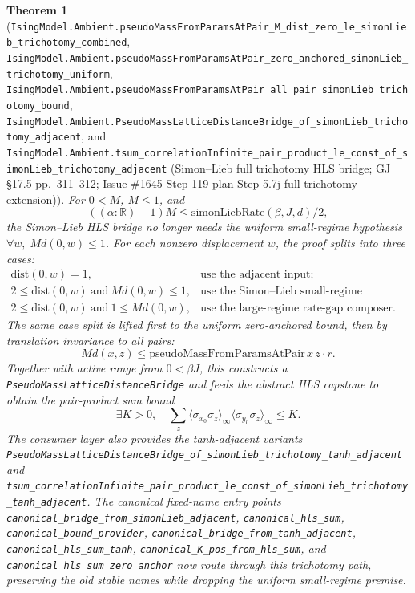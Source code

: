 \documentclass[a4paper,11pt]{article}
\newtheorem{theorem}{Theorem}
\begin{document}
\begin{theorem}[\texttt{IsingModel.Ambient.pseudoMassFromParamsAtPair\_M\_dist\_zero\_le\_simonLieb\_trichotomy\_combined},
\texttt{IsingModel.Ambient.pseudoMassFromParamsAtPair\_zero\_anchored\_simonLieb\_trichotomy\_uniform},
\texttt{IsingModel.Ambient.pseudoMassFromParamsAtPair\_all\_pair\_simonLieb\_trichotomy\_bound},
\texttt{IsingModel.Ambient.PseudoMassLatticeDistanceBridge\_of\_simonLieb\_trichotomy\_adjacent}, and
\texttt{IsingModel.Ambient.tsum\_correlationInfinite\_pair\_product\_le\_const\_of\_simonLieb\_trichotomy\_adjacent}
(Simon--Lieb full trichotomy HLS bridge; GJ \S17.5 pp.~311--312; Issue
\#1645 Step 119 plan Step 5.7j full-trichotomy extension)]
For $0 < M$, $M \le 1$, and
\[
  ((\alpha:\mathbb{R})+1)M \le \mathrm{simonLiebRate}(\beta,J,d)/2,
\]
the Simon--Lieb HLS bridge no longer needs the uniform small-regime hypothesis
$\forall w,\; M d(0,w) \le 1$.  For each nonzero displacement $w$, the proof
splits into three cases:
\[
\begin{array}{ll}
\mathrm{dist}(0,w)=1, & \text{use the adjacent input;}\\
2\le \mathrm{dist}(0,w)\ \text{and}\ M d(0,w)\le 1,
  & \text{use the Simon--Lieb small-regime composer;}\\
2\le \mathrm{dist}(0,w)\ \text{and}\ 1\le M d(0,w),
  & \text{use the large-regime rate-gap composer.}
\end{array}
\]
The same case split is lifted first to the uniform zero-anchored bound, then by
translation invariance to all pairs:
\[
  M d(x,z)
    \le
    \mathrm{pseudoMassFromParamsAtPair}\,x\,z \cdot r.
\]
Together with active range from $0<\beta J$, this constructs a
\texttt{PseudoMassLatticeDistanceBridge} and feeds the abstract HLS capstone to
obtain the pair-product sum bound
\[
  \exists K>0,\quad
  \sum_z \langle \sigma_{x_0}\sigma_z\rangle_\infty
         \langle \sigma_{y_0}\sigma_z\rangle_\infty
    \le K.
\]
The consumer layer also provides the tanh-adjacent variants
\texttt{PseudoMassLatticeDistanceBridge\_of\_simonLieb\_trichotomy\_tanh\_adjacent}
and
\texttt{tsum\_correlationInfinite\_pair\_product\_le\_const\_of\_simonLieb\_trichotomy\_tanh\_adjacent}.
The canonical fixed-name entry points
\texttt{canonical\_bridge\_from\_simonLieb\_adjacent},
\texttt{canonical\_hls\_sum}, \texttt{canonical\_bound\_provider},
\texttt{canonical\_bridge\_from\_tanh\_adjacent},
\texttt{canonical\_hls\_sum\_tanh},
\texttt{canonical\_K\_pos\_from\_hls\_sum}, and
\texttt{canonical\_hls\_sum\_zero\_anchor} now route through this trichotomy
path, preserving the old stable names while dropping the uniform
small-regime premise.
\end{theorem}
\end{document}
